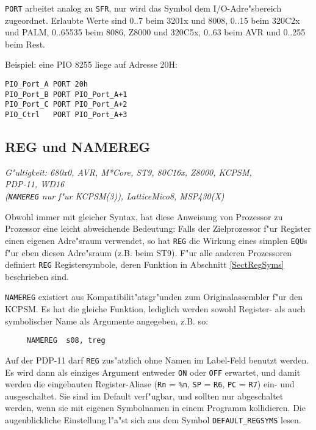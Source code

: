 \documentclass[12pt,a4paper,twoside]{report}
\makeatletter
\newcommand{\tty}[1]{{\tt #1}}
\newcommand{\ttindex}[1]{\index{#1@{\tt #1}}}
\makeatother
\begin{document}
\tty{PORT} arbeitet analog zu \tty{SFR}, nur wird das Symbol dem I/O-Adre"sbereich
zugeordnet.  Erlaubte Werte sind 0..7 beim 3201x und 8008, 0..15 beim 320C2x und PALM,
0..65535 beim 8086, Z8000 und 320C5x, 0..63 beim AVR und 0..255 beim Rest.
\par
Beispiel: eine PIO 8255 liege auf Adresse 20H:
\begin{verbatim}
PIO_Port_A PORT 20h
PIO_Port_B PORT PIO_Port_A+1
PIO_Port_C PORT PIO_Port_A+2
PIO_Ctrl   PORT PIO_Port_A+3
\end{verbatim}


\subsection{REG und NAMEREG}
\ttindex{REG}\ttindex{NAMEREG}

{\em G"ultigkeit: 680x0, AVR, M*Core, ST9, 80C16x, Z8000, KCPSM, \\
     PDP-11, WD16 \\
     (\tty{NAMEREG} nur f"ur KCPSM(3)), LatticeMico8, MSP430(X)}

Obwohl immer mit gleicher Syntax, hat diese Anweisung von Prozessor
zu Prozessor eine leicht abweichende Bedeutung: Falls der Zielprozessor
f"ur Register einen eigenen Adre"sraum verwendet, so hat \tty{REG}
die Wirkung eines simplen \tty{EQU}s f"ur eben diesen Adre"sraum (z.B. beim
ST9).  F"ur alle anderen Prozessoren definiert \tty{REG} Registersymbole,
deren Funktion in Abschnitt \ref{SectRegSyms} beschrieben sind.

{\tt NAMEREG} existiert aus Kompatibilit"atsgr"unden zum Originalassembler
f"ur den KCPSM.  Es hat die gleiche Funktion, lediglich werden sowohl
Register- als auch symbolischer Name als Argumente angegeben, z.B. so:
\begin{verbatim}
     NAMEREG  s08, treg
\end{verbatim}

Auf der PDP-11 darf \tty{REG} zus"atzlich ohne Namen im Label-Feld benutzt
werden.  Es wird dann als einziges Argument entweder \tty{ON} oder \tty{OFF}
erwartet, und damit werden die eingebauten Register-Aliase (\tty{Rn} = \tty{\%n},
\tty{SP} = \tty{R6}, \tty{PC} = \tty{R7}) ein- und ausgeschaltet.  Sie
sind im Default verf"ugbar, und sollten nur abgeschaltet werden, wenn
sie mit eigenen Symbolnamen in einem Programm kollidieren.  Die augenblickliche
Einstellung l"a"st sich aus dem Symbol \tty{DEFAULT\_REGSYMS} lesen.
\end{document}
